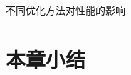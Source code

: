 \documentclass[degree=doctor]{thuthesis}
\begin{document}
不同优化方法对性能的影响

\section{本章小结}

%
%


\backmatter




% 





%



%
\end{document}
